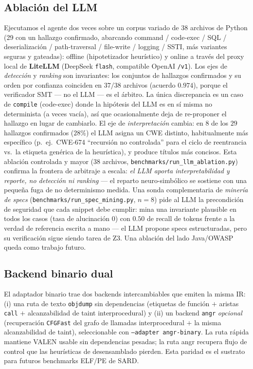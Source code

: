 \documentclass[11pt]{article}
\begin{document}
\subsection{Ablación del LLM}
Ejecutamos el agente dos veces sobre un corpus variado de 38 archivos de Python
(29 con un hallazgo confirmado, abarcando command / code-exec / SQL /
deserialización / path-traversal / file-write / logging / SSTI, más variantes
seguras y gateadas): offline (hipotetizador heurístico) y online a través del
proxy local de \textbf{LiteLLM} (DeepSeek \texttt{flash}, compatible OpenAI
\texttt{/v1}). Los ejes de \emph{detección} y \emph{ranking} son invariantes: los
conjuntos de hallazgos confirmados y su orden por confianza coinciden en $37/38$
archivos (acuerdo $0.974$), porque el verificador SMT --- no el LLM --- es el
árbitro. La única discrepancia es un caso de \texttt{compile} (code-exec) donde
la hipótesis del LLM es en sí misma no determinista (a veces vacía), así que
ocasionalmente deja de re-proponer el hallazgo en lugar de cambiarlo. El eje de
\emph{interpretación} cambia: en $8$ de los $29$ hallazgos confirmados ($28\%$)
el LLM asigna un CWE distinto, habitualmente más específico (p.~ej.\ CWE-674
``recursión no controlada'' para el ciclo de reentrancia vs.\ la etiqueta
genérica de la heurística), y produce títulos más concisos. Esta ablación
controlada y mayor (38 archivos, \texttt{benchmarks/run\_llm\_ablation.py})
confirma la frontera de arbitraje a escala: \emph{el LLM aporta
interpretabilidad y reporte, no detección ni ranking} --- el reparto
neuro-simbólico se sostiene con una pequeña fuga de no determinismo medida. Una
sonda complementaria de \emph{minería de specs}
(\texttt{benchmarks/run\_spec\_mining.py}, $n=8$) pide al LLM la precondición de
seguridad que cada snippet debe cumplir: mina una invariante plausible en todos
los casos (tasa de alucinación $0$) con $0.50$ de recall de tokens frente a la
verdad de referencia escrita a mano --- el LLM propone specs estructuradas, pero
su verificación sigue siendo tarea de Z3. Una ablación del lado Java/OWASP queda
como trabajo futuro.

\subsection{Backend binario dual}
El adaptador binario trae dos backends intercambiables que emiten la misma IR:
(i) una ruta de texto \texttt{objdump} sin dependencias (etiquetas de función
$+$ aristas \texttt{call} $+$ alcanzabilidad de taint interprocedural) y (ii) un
backend \texttt{angr} \emph{opcional} (recuperación \texttt{CFGFast} del grafo de
llamadas interprocedural $+$ la misma alcanzabilidad de taint), seleccionable con
\texttt{--adapter angr-binary}. La ruta rápida mantiene VALEN usable sin
dependencias pesadas; la ruta angr recupera flujo de control que las heurísticas
de desensamblado pierden. Esta paridad es el sustrato para futuros benchmarks
ELF/PE de SARD.
\end{document}
